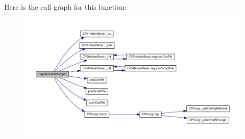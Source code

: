 Here is the call graph for this function:\nopagebreak
\begin{figure}[H]
\begin{center}
\leavevmode
\includegraphics[width=400pt]{classCPSWidget_a59080ee7d7949e19f5af41e26ff53806_cgraph}
\end{center}
\end{figure}




